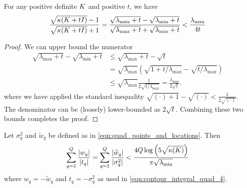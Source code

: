 \begin{lemma}
  For any positive definite $K$ and positive $t$, we have
  \begin{align}
    \frac{
      \sqrt{\kappa(K + t I)} - 1
    }{
      \sqrt{\kappa(K + t I)} + 1
    } = \frac{\sqrt{\lambda_\text{max} + t} - \sqrt{\lambda_\text{min} + t}  }{\sqrt{\lambda_\text{max} + t} + \sqrt{\lambda_\text{min} + t}  }
    < \frac{\lambda_\text{max}}{4t}
  \end{align}
  \label{lemma:condition}
\end{lemma}

\begin{proof}
  We can upper bound the numerator
  \begin{align*}
    \sqrt{\lambda_\text{max} + t} - \sqrt{\lambda_\text{min} + t}
    &\leq
    \sqrt{\lambda_\text{max} + t} - \sqrt{t}
    \\
    &=
    \sqrt{\lambda_\text{max}} \left( \sqrt{1 + t/\lambda_\text{max}} - \sqrt{t/\lambda_\text{max}} \right)
    \\
    &\leq
    \sqrt{\lambda_\text{max}} \frac{1}{2 \sqrt{t/\lambda_\text{max}}}
    =
    \frac{\lambda_\text{max}}{2 \sqrt{t}}.
  \end{align*}
  where we have applied the standard inequality $\sqrt{(\cdot)+1} - \sqrt{(\cdot)} < \frac{1}{2 \sqrt{(\cdot)}}$.
  The denominator can be (loosely) lower-bounded as $2\sqrt{t}$.
  Combining these two bounds completes the proof.
\end{proof}




\begin{lemma}
  Let $\sigma_q^2$ and $\widetilde w_q$ be defined as in \cref{eqn:quad_points_and_locations}.
  Then
  \begin{equation*}
    \sum_{q=1}^Q \frac{|w_q|}{|t_q|} = \sum_{q=1}^Q \frac{|\widetilde w_q|}{|\sigma^2_q|} < \frac{4 Q \log \left( 5 \sqrt{\kappa(K)} \right)  }{\pi \sqrt{\lambda_\text{min}}} \\
  \end{equation*}
  where $w_q = -\widetilde w_q$ and $t_q = -\sigma^2_q$ as used in \cref{eqn:contour_integral_quad_4}.
  \label{lemma:quad_ratio}
\end{lemma}

